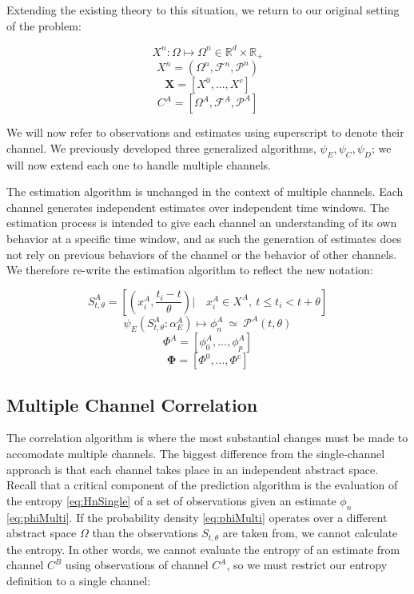 \documentclass[10pt]{article}
\begin{document}
Extending the existing theory to this situation, we return to our original setting of the problem:

\[ X^n : \Omega \mapsto \Omega^n \in \mathbb{R}^d \times \mathbb{R}_+ \]
\[ X^n = (\Omega^n,\mathcal{F}^n,\mathcal{P}^n) \]
\[ \mathbf{X} = [X^0,...,X^c]   \]
\[ C^A = [\Omega^A,\mathcal{F}^A,\mathcal{P}^A] \]


We will now refer to observations and estimates using superscript to denote their channel.  We previously developed three generalized algorithms, \(\psi_E, \psi_C, \psi_D \); we will now extend each one to handle multiple channels.

The estimation algorithm is unchanged in the context of multiple channels.  Each channel generates independent estimates over independent time windows.  The estimation process is intended to give each channel an understanding of its own behavior at a specific time window, and as such the generation of estimates does not rely on previous behaviors of the channel or the behavior of other channels.  We therefore re-write the estimation algorithm to reflect the new notation:

\begin{equation} S_{t,\theta}^A = \left[ \left( x_i^A,\frac{t_i - t}{\theta} \right) | \quad x_i^A \in X^A, \ t \le t_i < t + \theta \right] \end{equation}
\begin{equation} \label{eq:phiMulti} \psi_E( S_{t,\theta}^A:\alpha_E^A ) \mapsto \phi_n^A \ \simeq \ \mathcal{P}^A(t,\theta)  \end{equation}
\[ \Phi^A = [\phi_0^A,...,\phi_p^A ] \nonumber \]
\[ \boldsymbol{\Phi} = [\Phi^0,...,\Phi^c] \]

\subsection{Multiple Channel Correlation}

The correlation algorithm is where the most substantial changes must be made to accomodate multiple channels.  The biggest difference from the single-channel approach is that each channel takes place in an independent abstract space.  Recall that a critical component of the prediction algorithm is the evaluation of the entropy \ref{eq:HnSingle} of a set of observations given an estimate \( \phi_n \) \ref{eq:phiMulti}.  If the probability density \ref{eq:phiMulti} operates over a different abstract space \(\Omega \) than the observations \(S_{t,\theta} \) are taken from, we cannot calculate the entropy.  In other words, we cannot evaluate the entropy of an estimate from channel \(C^B \) using observations of channel \(C^A \), so we must restrict our entropy definition to a single channel:
\end{document}

